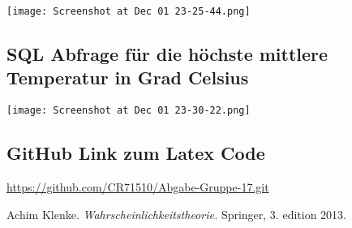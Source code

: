 \documentclass{article}
\begin{document}
\texttt{[image: Screenshot at Dec 01 23-25-44.png]}

\subsection{SQL Abfrage für die höchste mittlere Temperatur in Grad Celsius }

\texttt{[image: Screenshot at Dec 01 23-30-22.png]}

\subsection{GitHub Link zum Latex Code}
\url{https://github.com/CR71510/Abgabe-Gruppe-17.git}

\newpage
\begin{thebibliography}{9}
     Achim Klenke. \emph{Wahrscheinlichkeitstheorie.} Springer, 3. edition 2013.
\end{thebibliography}
\end{document}
